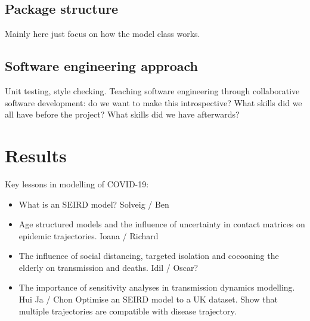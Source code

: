 \documentclass[]{article}
\begin{document}
\subsection{Package structure}
Mainly here just focus on how the model class works.

\subsection{Software engineering approach}
Unit testing, style checking.
Teaching software engineering through collaborative software development: do we want to make this introspective? What skills did we all have before the project? What skills did we have afterwards?


\section{Results}
Key lessons in modelling of COVID-19:

\begin{itemize}
	\item What is an SEIRD model? Solveig / Ben
	\item Age structured models and the influence of uncertainty in contact matrices on epidemic trajectories. Ioana / Richard
	\item The influence of social distancing, targeted isolation and cocooning the elderly on transmission and deaths. Idil / Oscar?
	\item The importance of sensitivity analyses in transmission dynamics modelling. Hui Ja / Chon
	\subitem Optimise an SEIRD model to a UK dataset. Show that multiple trajectories are compatible with disease trajectory.
\end{itemize}
	




\end{document}
